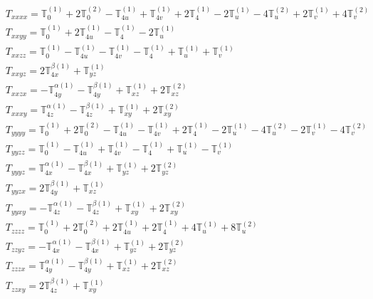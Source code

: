 \documentclass[fleqn,8pt,landscape]{jsarticle}
\begin{document}
\begin{align*}
& T_{xxxx} = \mathbb{T}_{0}^{(1)} + 2 \mathbb{T}_{0}^{(2)} - \mathbb{T}_{4u}^{(1)} + \mathbb{T}_{4v}^{(1)} + 2 \mathbb{T}_{4}^{(1)} - 2 \mathbb{T}_{u}^{(1)} - 4 \mathbb{T}_{u}^{(2)} + 2 \mathbb{T}_{v}^{(1)} + 4 \mathbb{T}_{v}^{(2)} \\
& T_{xxyy} = \mathbb{T}_{0}^{(1)} + 2 \mathbb{T}_{4u}^{(1)} - \mathbb{T}_{4}^{(1)} - 2 \mathbb{T}_{u}^{(1)} \\
& T_{xxzz} = \mathbb{T}_{0}^{(1)} - \mathbb{T}_{4u}^{(1)} - \mathbb{T}_{4v}^{(1)} - \mathbb{T}_{4}^{(1)} + \mathbb{T}_{u}^{(1)} + \mathbb{T}_{v}^{(1)} \\
& T_{xxyz} = 2 \mathbb{T}_{4x}^{\beta(1)} + \mathbb{T}_{yz}^{(1)} \\
& T_{xxzx} = - \mathbb{T}_{4y}^{\alpha(1)} - \mathbb{T}_{4y}^{\beta(1)} + \mathbb{T}_{xz}^{(1)} + 2 \mathbb{T}_{xz}^{(2)} \\
& T_{xxxy} = \mathbb{T}_{4z}^{\alpha(1)} - \mathbb{T}_{4z}^{\beta(1)} + \mathbb{T}_{xy}^{(1)} + 2 \mathbb{T}_{xy}^{(2)} \\
& T_{yyyy} = \mathbb{T}_{0}^{(1)} + 2 \mathbb{T}_{0}^{(2)} - \mathbb{T}_{4u}^{(1)} - \mathbb{T}_{4v}^{(1)} + 2 \mathbb{T}_{4}^{(1)} - 2 \mathbb{T}_{u}^{(1)} - 4 \mathbb{T}_{u}^{(2)} - 2 \mathbb{T}_{v}^{(1)} - 4 \mathbb{T}_{v}^{(2)} \\
& T_{yyzz} = \mathbb{T}_{0}^{(1)} - \mathbb{T}_{4u}^{(1)} + \mathbb{T}_{4v}^{(1)} - \mathbb{T}_{4}^{(1)} + \mathbb{T}_{u}^{(1)} - \mathbb{T}_{v}^{(1)} \\
& T_{yyyz} = \mathbb{T}_{4x}^{\alpha(1)} - \mathbb{T}_{4x}^{\beta(1)} + \mathbb{T}_{yz}^{(1)} + 2 \mathbb{T}_{yz}^{(2)} \\
& T_{yyzx} = 2 \mathbb{T}_{4y}^{\beta(1)} + \mathbb{T}_{xz}^{(1)} \\
& T_{yyxy} = - \mathbb{T}_{4z}^{\alpha(1)} - \mathbb{T}_{4z}^{\beta(1)} + \mathbb{T}_{xy}^{(1)} + 2 \mathbb{T}_{xy}^{(2)} \\
& T_{zzzz} = \mathbb{T}_{0}^{(1)} + 2 \mathbb{T}_{0}^{(2)} + 2 \mathbb{T}_{4u}^{(1)} + 2 \mathbb{T}_{4}^{(1)} + 4 \mathbb{T}_{u}^{(1)} + 8 \mathbb{T}_{u}^{(2)} \\
& T_{zzyz} = - \mathbb{T}_{4x}^{\alpha(1)} - \mathbb{T}_{4x}^{\beta(1)} + \mathbb{T}_{yz}^{(1)} + 2 \mathbb{T}_{yz}^{(2)} \\
& T_{zzzx} = \mathbb{T}_{4y}^{\alpha(1)} - \mathbb{T}_{4y}^{\beta(1)} + \mathbb{T}_{xz}^{(1)} + 2 \mathbb{T}_{xz}^{(2)} \\
& T_{zzxy} = 2 \mathbb{T}_{4z}^{\beta(1)} + \mathbb{T}_{xy}^{(1)} \\

\end{align*}
\end{document}
